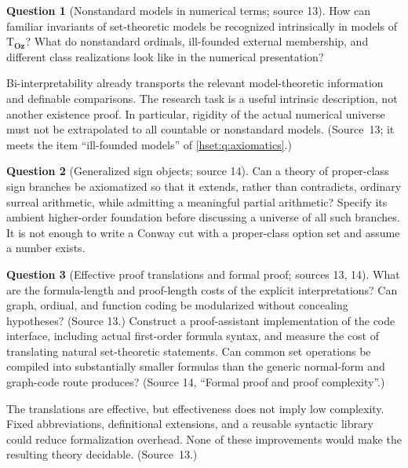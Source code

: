 \documentclass[11pt,letterpaper]{article}
\theoremstyle{definition}
\newtheorem{question}[question]{Question}\aliascntresetthe{question}
\theoremstyle{remark}
\newcommand{\Oz}{\mathbf{Oz}}
\newcommand{\Tth}{\mathrm{T}}
\begin{document}
\begin{question}[Nonstandard models in numerical terms; source 13]\label{hset:sf:q:nonstandard}
How can familiar invariants of set-theoretic models be recognized intrinsically in
models of $\Tth_{\Oz}$? What do nonstandard ordinals, ill-founded external
membership, and different class realizations look like in the numerical
presentation?
\end{question}

Bi-interpretability already transports the relevant model-theoretic information and
definable comparisons. The research task is a useful intrinsic description, not
another existence proof. In particular, rigidity of the actual numerical universe
must not be extrapolated to all countable or nonstandard models. (Source~13; it meets
the item ``ill-founded models'' of \cref{hset:q:axiomatics}.)

\begin{question}[Generalized sign objects; source 14]\label{hset:sf:q:signobjects}
Can a theory of proper-class sign branches be axiomatized so that it extends, rather
than contradicts, ordinary surreal arithmetic, while admitting a meaningful partial
arithmetic? Specify its ambient higher-order foundation before discussing a universe
of all such branches. It is not enough to write a Conway cut with a proper-class
option set and assume a number exists.
\end{question}

\begin{question}[Effective proof translations and formal proof; sources 13, 14]\label{hset:sf:q:formal}
What are the formula-length and proof-length costs of the explicit interpretations?
Can graph, ordinal, and function coding be modularized without concealing hypotheses?
(Source 13.) Construct a proof-assistant implementation of the code interface,
including actual first-order formula syntax, and measure the cost of translating
natural set-theoretic statements. Can common set operations be compiled into
substantially smaller formulas than the generic normal-form and graph-code route
produces? (Source 14, ``Formal proof and proof complexity''.)
\end{question}

The translations are effective, but effectiveness does not imply low complexity.
Fixed abbreviations, definitional extensions, and a reusable syntactic library could
reduce formalization overhead. None of these improvements would make the resulting
theory decidable. (Source~13.)
\end{document}
